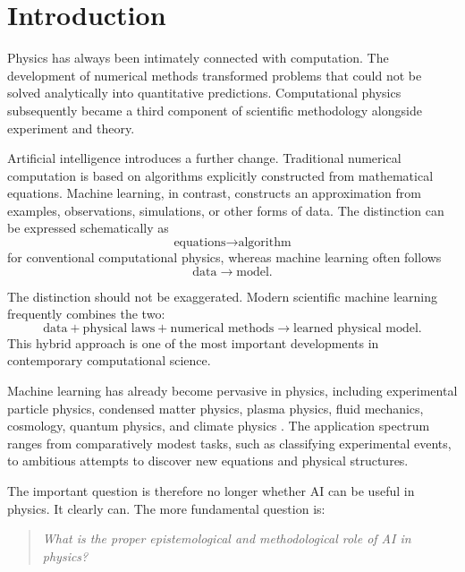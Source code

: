 \documentclass[11pt,a4paper]{article}
\begin{document}
\tableofcontents

\section{Introduction}

Physics has always been intimately connected with computation. The development
of numerical methods transformed problems that could not be solved analytically
into quantitative predictions. Computational physics subsequently became a
third component of scientific methodology alongside experiment and theory.

Artificial intelligence introduces a further change. Traditional numerical
computation is based on algorithms explicitly constructed from mathematical
equations. Machine learning, in contrast, constructs an approximation from
examples, observations, simulations, or other forms of data. The distinction
can be expressed schematically as
\begin{equation}
\text{equations} \longrightarrow \text{algorithm}
\end{equation}
for conventional computational physics, whereas machine learning often follows
\begin{equation}
\text{data} \longrightarrow \text{model}.
\end{equation}

The distinction should not be exaggerated. Modern scientific machine learning
frequently combines the two:
\begin{equation}
\text{data}+\text{physical laws}+\text{numerical methods}
\longrightarrow
\text{learned physical model}.
\end{equation}
This hybrid approach is one of the most important developments in contemporary
computational science.

Machine learning has already become pervasive in physics, including
experimental particle physics, condensed matter physics, plasma physics,
fluid mechanics, cosmology, quantum physics, and climate physics
\cite{Carleo2019,Karagiorgi2022,Karn2021,Brunton2020}.
The application spectrum ranges from comparatively modest tasks, such as
classifying experimental events, to ambitious attempts to discover new
equations and physical structures.

The important question is therefore no longer whether AI can be useful in
physics. It clearly can. The more fundamental question is:

\begin{quote}
\emph{What is the proper epistemological and methodological role of AI in
physics?}
\end{quote}
\end{document}
